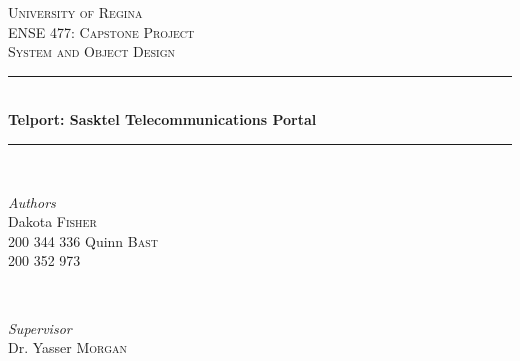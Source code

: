 \documentclass[12pt]{article}
\begin{document}

\begin{titlepage} %
	\newcommand{\HRule}{\rule{\linewidth}{0.5mm}} %
	
	\center %
	
	
	\textsc{\LARGE University of Regina}\\[1.5cm] %
	
	\textsc{\Large ENSE 477: Capstone Project}\\[0.5cm] %
	
	\textsc{\large System and Object Design}\\[0.5cm] %
	
	
	\HRule\\[0.4cm]
	
	{\huge\bfseries Telport: Sasktel Telecommunications Portal}\\[0.4cm] %
	
	\HRule\\[1.5cm]
	
	
	\begin{minipage}[t]{0.4\textwidth}
		\begin{flushleft}
			\large
			\textit{Authors}\\
			Dakota \textsc{Fisher}\\ %
			200 344 336\newline \newline
			Quinn \textsc{Bast}\\ %
			200 352 973
		\end{flushleft}
	\end{minipage}
	~
	\begin{minipage}[t]{0.4\textwidth}
		\begin{flushright}
			\large
			\textit{Supervisor}\\
			Dr. Yasser \textsc{Morgan} %
		\end{flushright}
	\end{minipage}
	

\end{titlepage}
\end{document}
